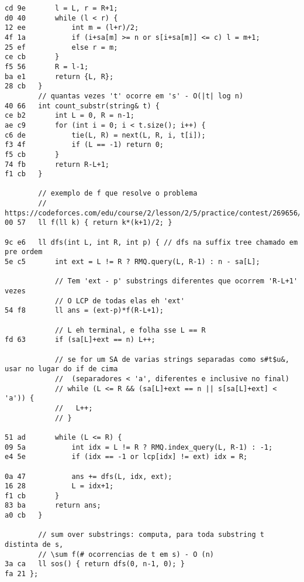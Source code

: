 \documentclass[11pt, a4paper, twoside]{article}
\begin{document}
\begin{lstlisting}
cd 9e 		l = L, r = R+1;
d0 40 		while (l < r) {
12 ee 			int m = (l+r)/2;
4f 1a 			if (i+sa[m] >= n or s[i+sa[m]] <= c) l = m+1;
25 ef 			else r = m;
ce cb 		}
f5 56 		R = l-1;
ba e1 		return {L, R};
28 cb 	}
      	// quantas vezes 't' ocorre em 's' - O(|t| log n)
40 66 	int count_substr(string& t) {
ce b2 		int L = 0, R = n-1;
ae c9 		for (int i = 0; i < t.size(); i++) {
c6 de 			tie(L, R) = next(L, R, i, t[i]);
f3 4f 			if (L == -1) return 0;
f5 cb 		}
74 fb 		return R-L+1;
f1 cb 	}
      
      	// exemplo de f que resolve o problema
      	// https://codeforces.com/edu/course/2/lesson/2/5/practice/contest/269656/problem/D
00 57 	ll f(ll k) { return k*(k+1)/2; }
      
9c e6 	ll dfs(int L, int R, int p) { // dfs na suffix tree chamado em pre ordem
5e c5 		int ext = L != R ? RMQ.query(L, R-1) : n - sa[L];
      
      		// Tem 'ext - p' substrings diferentes que ocorrem 'R-L+1' vezes
      		// O LCP de todas elas eh 'ext'
54 f8 		ll ans = (ext-p)*f(R-L+1);
      
      		// L eh terminal, e folha sse L == R
fd 63 		if (sa[L]+ext == n) L++;
      
      		// se for um SA de varias strings separadas como s#t$u&, usar no lugar do if de cima
      		//	(separadores < 'a', diferentes e inclusive no final)
      		// while (L <= R && (sa[L]+ext == n || s[sa[L]+ext] < 'a')) {
      		//   L++;
      		// }
      
51 ad 		while (L <= R) {
09 5a 			int idx = L != R ? RMQ.index_query(L, R-1) : -1;
e4 5e 			if (idx == -1 or lcp[idx] != ext) idx = R;
      
0a 47 			ans += dfs(L, idx, ext);
16 28 			L = idx+1;
f1 cb 		}
83 ba 		return ans;
a0 cb 	}
      
      	// sum over substrings: computa, para toda substring t distinta de s,
      	// \sum f(# ocorrencias de t em s) - O (n)
3a ca 	ll sos() { return dfs(0, n-1, 0); }
fa 21 };
\end{lstlisting}
\end{document}
